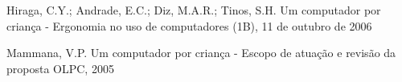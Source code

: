 \documentclass[
12pt,		%
openright,	%
twoside,  %
a4paper,			%
chapter=TITLE,		%
english,			%
french,				%
spanish,			%
brazil				%
]{USPSC-classe/USPSC}
\begin{document}
\begin{flushleft}
\begin{flushleft}
\begin{flushleft}
\begin{flushleft}
\begin{flushleft}
\begin{flushleft}
\begin{flushleft}
\begin{flushleft}
[HIRAGA et al., 2006] Hiraga, C.Y.; Andrade, E.C.; Diz, M.A.R.; Tinos, S.H. Um computador por crian\c{c}a - Ergonomia no uso de computadores (1B), 11 de outubro de 2006
\end{flushleft}


\end{flushleft}


\end{flushleft}


\end{flushleft}


\end{flushleft}


\end{flushleft}


\end{flushleft}


\end{flushleft}


\begin{flushleft}
\begin{flushleft}
\begin{flushleft}
\begin{flushleft}
\begin{flushleft}
\begin{flushleft}
\begin{flushleft}
\begin{flushleft}
[MAMMANA, 2005a] Mammana, V.P. Um computador por crian\c{c}a - Escopo de atua\c{c}\~ao e revis\~ao da proposta OLPC, 2005
\end{flushleft}


\end{flushleft}


\end{flushleft}


\end{flushleft}


\end{flushleft}


\end{flushleft}


\end{flushleft}


\end{flushleft}
\end{document}
